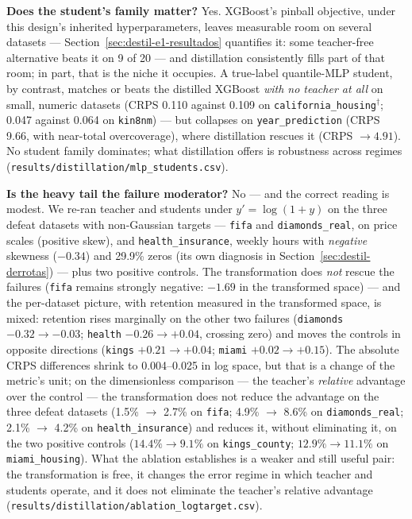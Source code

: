 \textbf{Does the student's family matter?} Yes. XGBoost's pinball
objective, under this design's inherited hyperparameters, leaves
measurable room on several datasets ---
Section~\ref{sec:destil-e1-resultados} quantifies it: some
teacher-free alternative beats it on 9 of 20 --- and distillation
consistently fills part of that room; in part, that is the niche it
occupies. A true-label quantile-MLP student, by contrast, matches
or beats
the distilled XGBoost \emph{with no teacher at all} on small,
numeric datasets (CRPS 0.110 against 0.109 on
\texttt{california\_\allowbreak housing}$^\dagger$; 0.047 against
0.064 on \texttt{kin8nm}) --- but collapses on
\texttt{year\_\allowbreak prediction} (CRPS 9.66, with near-total
overcoverage), where distillation rescues it (CRPS $\to 4.91$). No
student family dominates; what distillation offers is robustness
across regimes
(\texttt{results/\allowbreak distillation/\allowbreak mlp\_\allowbreak students.\allowbreak csv}).

\textbf{Is the heavy tail the failure moderator?} No --- and the
correct reading is modest. We re-ran teacher and students under
$y' = \log(1+y)$ on the three defeat datasets with non-Gaussian
targets
--- \texttt{fifa} and \texttt{diamonds\_\allowbreak real}, on price
scales (positive skew), and \texttt{health\_\allowbreak insurance},
weekly hours with \emph{negative} skewness ($-0.34$) and
29.9\% zeros (its own diagnosis in
Section~\ref{sec:destil-derrotas}) --- plus two positive controls.
The transformation does \emph{not} rescue the failures
(\texttt{fifa} remains strongly negative: $-1.69$ in the
transformed space) --- and the per-dataset picture,
with retention measured in the transformed space, is mixed:
retention rises marginally on the other two failures
(\texttt{diamonds} $-0.32 \to -0.03$; \texttt{health}
$-0.26 \to +0.04$, crossing zero) and moves the controls in opposite
directions (\texttt{kings} $+0.21 \to +0.04$; \texttt{miami}
$+0.02 \to +0.15$). The absolute CRPS differences
shrink to 0.004--0.025 in log space, but that is a change of the
metric's unit; on the dimensionless comparison --- the teacher's
\emph{relative} advantage over the control --- the transformation
does not reduce the advantage on the three defeat datasets (1.5\%
$\to$ 2.7\% on \texttt{fifa}; 4.9\% $\to$ 8.6\% on
\texttt{diamonds\_\allowbreak real}; 2.1\% $\to$ 4.2\% on
\texttt{health\_\allowbreak insurance}) and reduces it, without
eliminating it, on the two positive controls
($14.4\%\!\to\!9.1\%$ on \texttt{kings\_\allowbreak county};
$12.9\%\!\to\!11.1\%$ on \texttt{miami\_\allowbreak housing}). What
the ablation establishes is a weaker and still useful pair: the
transformation is free, it changes the error regime in which
teacher and students operate, and it does not eliminate the
teacher's relative advantage
(\texttt{results/\allowbreak distillation/\allowbreak ablation\_\allowbreak logtarget.\allowbreak csv}).

